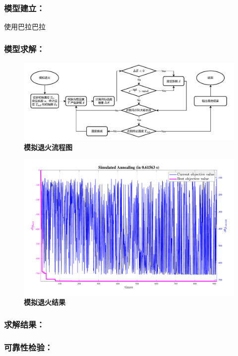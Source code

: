 \documentclass[zihao=-4,UTF8]{article}
\begin{document}
\subsubsection{模型建立：}
使用巴拉巴拉
\subsubsection{模型求解：}

\begin{figure}[H]
  \centering
  \includegraphics[width=\textwidth]{assets/模拟退火流程图.drawio.pdf}
  \caption{\textbf{模拟退火流程图}}\label{模拟退火流程图}
\end{figure}

\begin{figure}[H]
  \centering
  \includegraphics[width=\textwidth]{assets/2024-08-15_13-50-23.pdf}
  \caption{\textbf{模拟退火结果}}\label{模拟退火结果}
\end{figure}

\subsubsection{求解结果：}
\subsubsection{可靠性检验：}
\end{document}
